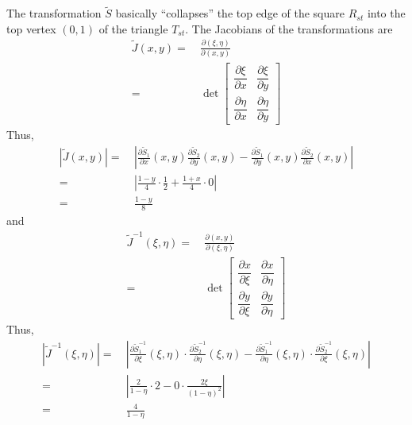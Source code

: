 \documentclass[a4paper]{article}
\numberwithin{equation}{section}
\begin{document}
The transformation $\widetilde S$ basically ``collapses'' the top edge of the square $R_{st}$ into the top vertex $\left(0,1\right)$ of the triangle $T_{st}$. The Jacobians of the transformations are
\begin{align}
\widetilde J\left( {x,y} \right) =&\ \frac{{\partial \left( {\xi ,\eta } \right)}}{{\partial \left( {x,y} \right)}}\\
 =&\ \det \left[ {\begin{array}{*{20}{c}}
{\dfrac{{\partial \xi }}{{\partial x}}}&{\dfrac{{\partial \xi }}{{\partial y}}}\\
{\dfrac{{\partial \eta }}{{\partial x}}}&{\dfrac{{\partial \eta }}{{\partial y}}}
\end{array}} \right]
\end{align}
Thus,
\begin{align}
\left| {\widetilde J\left( {x,y} \right)} \right| =&\ \left| {\frac{{\partial {{\widetilde S}_1}}}{{\partial x}}\left( {x,y} \right)\frac{{\partial {{\widetilde S}_2}}}{{\partial y}}\left( {x,y} \right) - \frac{{\partial {{\widetilde S}_1}}}{{\partial y}}\left( {x,y} \right)\frac{{\partial {{\widetilde S}_2}}}{{\partial x}}\left( {x,y} \right)} \right|\\
 =&\ \left| {\frac{{1 - y}}{4} \cdot \frac{1}{2} + \frac{{1 + x}}{4} \cdot 0} \right|\\
 =&\ \frac{{1 - y}}{8}
\end{align}
and
\begin{align}
{\widetilde J^{ - 1}}\left( {\xi ,\eta } \right) =&\ \frac{{\partial \left( {x,y} \right)}}{{\partial \left( {\xi ,\eta } \right)}}\\
 =&\ \det \left[ {\begin{array}{*{20}{c}}
{\dfrac{{\partial x}}{{\partial \xi }}}&{\dfrac{{\partial x}}{{\partial \eta }}}\\
{\dfrac{{\partial y}}{{\partial \xi }}}&{\dfrac{{\partial y}}{{\partial \eta }}}
\end{array}} \right]
\end{align}
Thus,
\begin{align}
\left| {{{\widetilde J}^{ - 1}}\left( {\xi ,\eta } \right)} \right| =&\ \left| {\frac{{\partial \widetilde S_1^{ - 1}}}{{\partial \xi }}\left( {\xi ,\eta } \right) \cdot \frac{{\partial \widetilde S_2^{ - 1}}}{{\partial \eta }}\left( {\xi ,\eta } \right) - \frac{{\partial \widetilde S_1^{ - 1}}}{{\partial \eta }}\left( {\xi ,\eta } \right) \cdot \frac{{\partial \widetilde S_2^{ - 1}}}{{\partial \xi }}\left( {\xi ,\eta } \right)} \right|\\
=&\ \left| {\frac{2}{{1 - \eta }} \cdot 2 - 0 \cdot \frac{{2\xi }}{{{{\left( {1 - \eta } \right)}^2}}}} \right|\\
 =&\ \frac{4}{{1 - \eta }}
\end{align}
\end{document}

